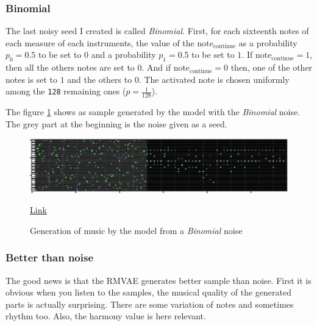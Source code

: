 \documentclass[12pt]{report}
\begin{document}
\subsubsection{Binomial}

The last noisy seed I created is called \textit{Binomial}.
First, for each sixteenth notes of each measure of each instruments, the value of the $\text{note}_{\text{continue}}$ as a probability $p_0=0.5$ to be set to $0$ and a probability $p_1=0.5$ to be set to $1$.
If $\text{note}_{\text{continue}} = 1$, then all the others notes are set to $0$.
And if $\text{note}_{\text{continue}} = 0$ then, one of the other notes is set to $1$ and the others to $0$.
The activated note is chosen uniformly among the \texttt{128} remaining ones ($p=\frac{1}{128}$).

The figure \ref{fig:task:noise:binomial} shows as sample generated by the model with the \textit{Binomial} noise.
The grey part at the beginning is the noise given as a seed.

\begin{figure}[htbp]
    \centering
    \includegraphics[width=\textwidth]{images/generated_midis/tasks/generate-noise/generate-noise-binary.jpg}
    \caption{Generation of music by the model from a \textit{Binomial} noise}
    \href{https://github.com/ValentinVignal/midiGenerator/blob/master/samples/tasks/generated_noise_binary.mid}{Link}
    \label{fig:task:noise:binomial}
\end{figure}

\subsubsection{Better than noise}

The good news is that the RMVAE generates better sample than noise.
First it is obvious when you listen to the samples, the musical quality of the generated parts is actually surprising.
There are some variation of notes and sometimes rhythm too.
Also, the harmony value is here relevant.
\end{document}
